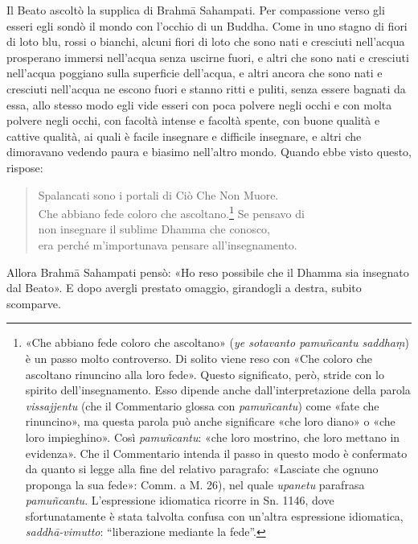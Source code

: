 Il Beato ascoltò la supplica di Brahmā Sahampati. Per compassione verso
gli esseri egli sondò il mondo con l’occhio di un Buddha. Come in uno
stagno di fiori di loto blu, rossi o bianchi, alcuni fiori di loto che
sono nati e cresciuti nell’acqua prosperano immersi nell’acqua senza
uscirne fuori, e altri che sono nati e cresciuti nell’acqua poggiano
sulla superficie dell’acqua, e altri ancora che sono nati e cresciuti
nell’acqua ne escono fuori e stanno ritti e puliti, senza essere bagnati
da essa, allo stesso modo egli vide esseri con poca polvere negli occhi
e con molta polvere negli occhi, con facoltà intense e facoltà spente,
con buone qualità e cattive qualità, ai quali è facile insegnare e
difficile insegnare, e altri che dimoravano vedendo paura e biasimo
nell’altro mondo. Quando ebbe visto questo, rispose:


\begin{quote}
Spalancati sono i portali di Ciò Che Non Muore. \\
Che abbiano fede coloro che ascoltano.\footnote{«Che abbiano fede coloro che ascoltano» (\emph{ye sotavanto pamuñcantu saddhaṃ}) è un passo molto controverso. Di solito viene reso con «Che coloro che ascoltano rinuncino alla loro fede». Questo significato, però, stride con lo spirito dell’insegnamento. Esso dipende anche dall’interpretazione della parola \emph{vissajjentu} (che il Commentario glossa con \emph{pamuñcantu}) come «fate che rinuncino», ma questa parola può anche significare «che loro diano» o «che loro impieghino». Così \emph{pamuñcantu}: «che loro mostrino, che loro mettano in evidenza». Che il Commentario intenda il passo in questo modo è confermato da quanto si legge alla fine del relativo paragrafo: «Lasciate che ognuno proponga la sua fede»: Comm. a M. 26), nel quale \emph{upanetu} parafrasa \emph{pamuñcantu}. L’espressione idiomatica ricorre in Sn. 1146, dove sfortunatamente è stata talvolta confusa con un’altra espressione idiomatica, \emph{saddhā-vimutto}: “liberazione mediante la fede”.} Se pensavo di \\
non insegnare il sublime Dhamma che conosco, \\
era perché m’importunava pensare all’insegnamento.
\end{quote}

Allora Brahmā Sahampati pensò: «Ho reso possibile che il Dhamma sia
insegnato dal Beato». E dopo avergli prestato omaggio, girandogli a
destra, subito scomparve.




